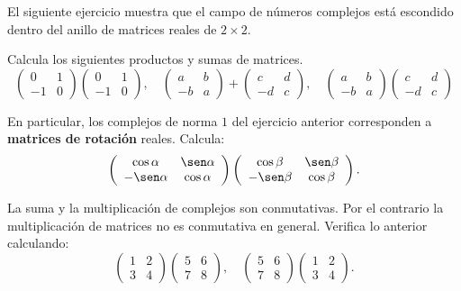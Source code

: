 El siguiente ejercicio muestra que el campo de números complejos está escondido dentro del anillo de matrices reales de $2\times 2$.
\begin{ejercicio}
Calcula los siguientes productos y sumas de matrices.
$$\left(\begin{array}{cc}
0&1 \\
-1&0 
\end{array}\right)
\left(\begin{array}{cc}
0&1 \\
-1&0 
\end{array}\right) 
,\quad
\left(\begin{array}{cc}
a&b \\
-b&a 
\end{array}\right)
+
\left(\begin{array}{cc}
c&d \\
-d&c 
\end{array}\right)
,\quad
\left(\begin{array}{cc}
a&b \\
-b&a 
\end{array}\right)
\left(\begin{array}{cc}
c&d \\
-d&c 
\end{array}\right)$$
\end{ejercicio}


\begin{ejercicio}
En particular, los complejos de norma $1$ del ejercicio anterior corresponden a {\bf matrices de rotación} reales. Calcula:
$$\left(\begin{array}{cc}
\cos\alpha&\sen\alpha \\
-\sen\alpha&\cos\alpha 
\end{array}\right)
\left(\begin{array}{cc}
\cos\beta&\sen\beta \\
-\sen\beta&\cos\beta 
\end{array}\right).
$$

\end{ejercicio}



\begin{ejercicio}
La suma y la multiplicación de complejos son conmutativas. Por el contrario la multiplicación de matrices no es conmutativa en general. Verifica lo anterior calculando:
$$\left(\begin{array}{cc}
1&2 \\
3&4 
\end{array}\right)
\left(\begin{array}{cc}
5&6 \\
7&8 
\end{array}\right),
\quad
\left(\begin{array}{cc}
5&6 \\
7&8 
\end{array}\right)
\left(\begin{array}{cc}
1&2 \\
3&4 
\end{array}\right)
.
$$
\end{ejercicio}

